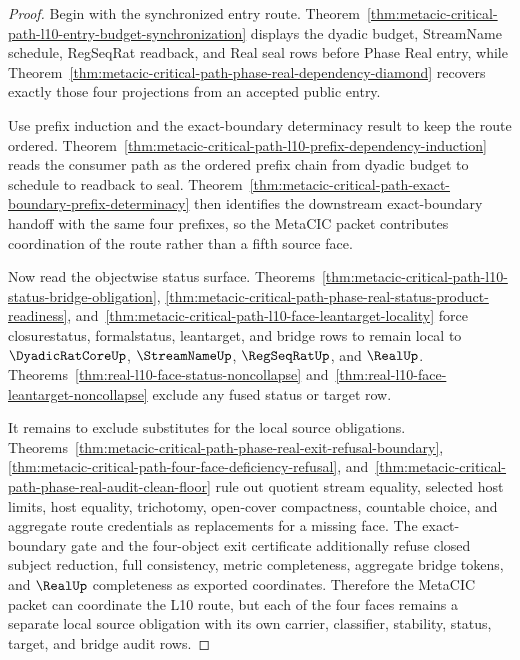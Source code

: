\begin{proof}
Begin with the synchronized entry route. Theorem~\ref{thm:metacic-critical-path-l10-entry-budget-synchronization} displays the dyadic budget, StreamName schedule, RegSeqRat readback, and Real seal rows before Phase Real entry, while Theorem~\ref{thm:metacic-critical-path-phase-real-dependency-diamond} recovers exactly those four projections from an accepted public entry.

Use prefix induction and the exact-boundary determinacy result to keep the route ordered. Theorem~\ref{thm:metacic-critical-path-l10-prefix-dependency-induction} reads the consumer path as the ordered prefix chain from dyadic budget to schedule to readback to seal. Theorem~\ref{thm:metacic-critical-path-exact-boundary-prefix-determinacy} then identifies the downstream exact-boundary handoff with the same four prefixes, so the MetaCIC packet contributes coordination of the route rather than a fifth source face.

Now read the objectwise status surface. Theorems~\ref{thm:metacic-critical-path-l10-status-bridge-obligation}, \ref{thm:metacic-critical-path-phase-real-status-product-readiness}, and~\ref{thm:metacic-critical-path-l10-face-leantarget-locality} force closurestatus, formalstatus, leantarget, and bridge rows to remain local to $\DyadicRatCoreUp$, $\StreamNameUp$, $\RegSeqRatUp$, and $\RealUp$. Theorems~\ref{thm:real-l10-face-status-noncollapse} and~\ref{thm:real-l10-face-leantarget-noncollapse} exclude any fused status or target row.

It remains to exclude substitutes for the local source obligations. Theorems~\ref{thm:metacic-critical-path-phase-real-exit-refusal-boundary}, \ref{thm:metacic-critical-path-four-face-deficiency-refusal}, and~\ref{thm:metacic-critical-path-phase-real-audit-clean-floor} rule out quotient stream equality, selected host limits, host equality, trichotomy, open-cover compactness, countable choice, and aggregate route credentials as replacements for a missing face. The exact-boundary gate and the four-object exit certificate additionally refuse closed subject reduction, full consistency, metric completeness, aggregate bridge tokens, and $\RealUp$ completeness as exported coordinates. Therefore the MetaCIC packet can coordinate the L10 route, but each of the four faces remains a separate local source obligation with its own carrier, classifier, stability, status, target, and bridge audit rows.
\end{proof}

